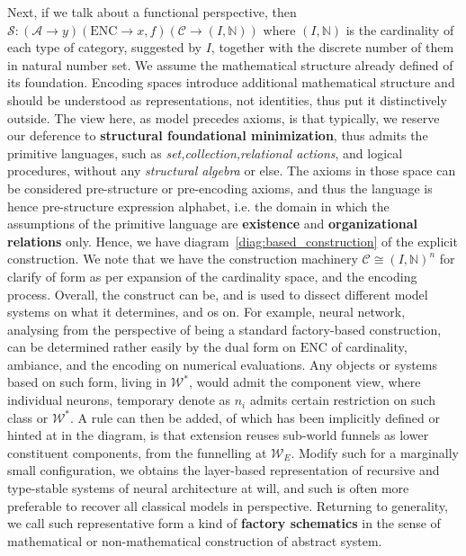 Next, if we talk about a functional perspective, then $\mathcal{S}:(\mathcal{A}\to y)(\mathrm{ENC}\to x,f)(\mathcal{C}\to (I,\mathbb{N}))$ where $(I,\mathbb{N})$ is the cardinality of each type of category, suggested by $I$, together with the discrete number of them in natural number set. We assume the mathematical structure already defined of its foundation. Encoding spaces introduce additional mathematical structure and should be understood as representations, not identities, thus put it distinctively outside. The view here, as model precedes axioms, is that typically, we reserve our deference to \textbf{structural foundational minimization}, thus admits the primitive languages, such as \textit{set,collection,relational actions}, and logical procedures, without any \textit{structural algebra} or else. The axioms in those space can be considered pre-structure or pre-encoding axioms, and thus the language is hence pre-structure expression alphabet, i.e. the domain in which the assumptions of the primitive language are \textbf{existence} and \textbf{organizational relations} only. Hence, we have diagram~\ref{diag:based_construction} of the explicit construction. We note that we have the construction machinery $\mathcal{C}\cong (I,\mathbb{N})^{n}$ for clarify of form as per expansion of the cardinality space, and the encoding process. Overall, the construct can be, and is used to dissect different model systems on what it determines, and os on. For example, neural network, analysing from the perspective of being a standard factory-based construction, can be determined rather easily by the dual form on $\mathrm{ENC}$ of cardinality, ambiance, and the encoding on numerical evaluations. Any objects or systems based on such form, living in $\mathcal{W}^{*}$, would admit the component view, where individual neurons, temporary denote as $n_{i}$ admits certain restriction on such class or $\mathcal{W}^{*}$. A rule can then be added, of which has been implicitly defined or hinted at in the diagram, is that extension reuses sub-world funnels as lower constituent components, from the funnelling at $\mathcal{W}_{E}$. Modify such for a marginally small configuration, we obtains the layer-based representation of recursive and type-stable systems of neural architecture at will, and such is often more preferable to recover all classical models in perspective. Returning to generality, we call such representative form a kind of \textbf{factory schematics} in the sense of mathematical or non-mathematical construction of abstract system. 

